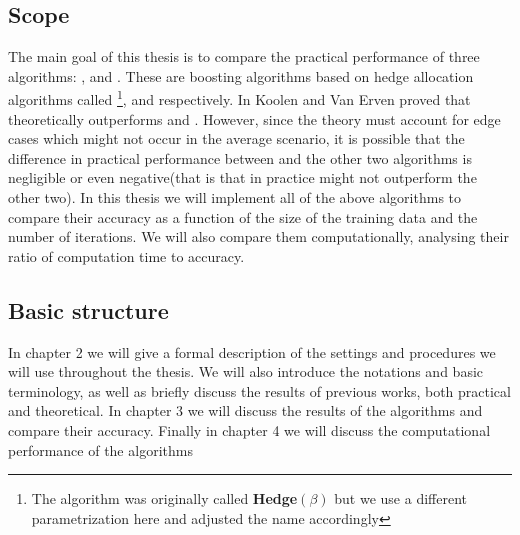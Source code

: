 \subsection{Scope}
The main goal of this thesis is to compare the practical performance of three algorithms: \adaB, \NHB and \squintB. These are boosting algorithms based on hedge allocation algorithms called \hedge\footnote{The algorithm was originally called \textbf{Hedge}$(\beta)$ but we use a different parametrization here and adjusted the name accordingly}, \adaN and \squint respectively. In \cite{Koolen2015} Koolen and Van Erven proved that \squint theoretically outperforms \hedge and \adaN. However, since the theory must account for edge cases which might not occur in the average scenario, it is possible that the difference in practical performance between \squint and the other two algorithms is negligible or even negative(that is that in practice \squintB might not outperform the other two). In this thesis we will implement all of the above algorithms to compare their accuracy as a function of the size of the training data and the number of iterations. We will also compare them computationally, analysing their ratio of computation time to accuracy.  

\subsection{Basic structure}
In chapter 2 we will give a formal description of the settings and procedures we will use throughout the thesis. We will also introduce the notations and basic terminology, as well as briefly discuss the results of previous works, both practical and theoretical. In chapter 3 we will discuss the results of the algorithms and compare their accuracy. Finally in chapter 4 we will discuss the computational performance of the algorithms    
